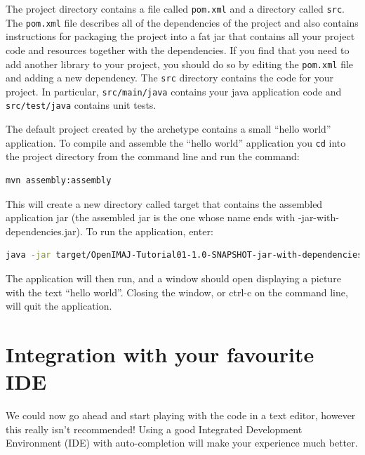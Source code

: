 The project directory contains a file called \verb+pom.xml+ and a directory called \verb+src+. 
The \verb+pom.xml+ file describes all of the dependencies of the project and also contains 
instructions for packaging the project into a fat jar that contains all your project code and 
resources together with the dependencies. If you find that you need to add another library to 
your project, you should do so by editing the \verb+pom.xml+ file and adding a new dependency. 
The \verb+src+ directory contains the code for your project. In particular, \verb+src/main/java+ 
contains your java application code and \verb+src/test/java+ contains unit tests.

The default project created by the archetype contains a small ``hello world'' application. To 
compile and assemble the ``hello world'' application you \verb+cd+ into the project directory 
from the command line and run the command:
\begin{lstlisting}[language=bash]
mvn assembly:assembly
\end{lstlisting}
This will create a new directory called target that contains the assembled application jar 
(the assembled jar is the one whose name ends with -jar-with-dependencies.jar). To run the 
application, enter: 
\begin{lstlisting}[language=bash]
java -jar target/OpenIMAJ-Tutorial01-1.0-SNAPSHOT-jar-with-dependencies.jar
\end{lstlisting}
The application will then run, and a window should open displaying a picture with the text 
``hello world''. Closing the window, or ctrl-c on the command line, will quit the application.

\section*{Integration with your favourite IDE}
We could now go ahead and start playing with the code in a text editor, however this really 
isn't recommended! Using a good Integrated Development Environment (IDE) with auto-completion will 
make your experience much better.

